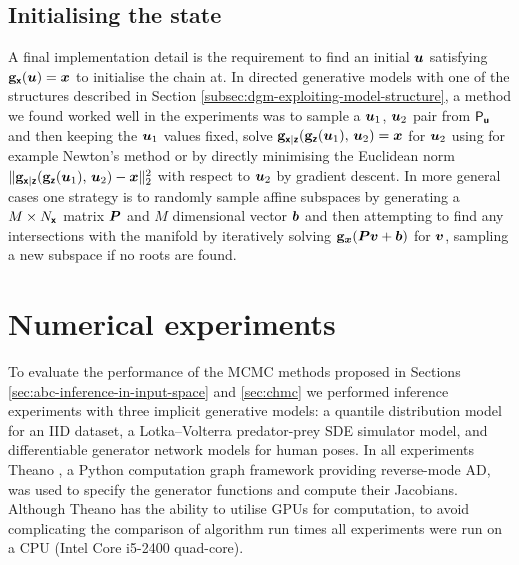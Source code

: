 \subsection{Initialising the state}

A final implementation detail is the requirement to find an initial $\boldsymbol{u}$ satisfying ${\mathbf{g}}_{\boldsymbol{\mathsf{x}}}(\boldsymbol{u}) = \boldsymbol{x}$ to initialise the chain at. In directed generative models with one of the structures described in Section \ref{subsec:dgm-exploiting-model-structure}, a method we found worked well in the experiments was to sample a $\boldsymbol{u}_1$, $\boldsymbol{u}_2$ pair from $\mathsf{P}_{\boldsymbol{\mathsf{u}}}$ and then keeping the $\boldsymbol{u}_1$ values fixed, solve $\genfunc_{\rvct{x}|\rvct{z}}\lpa\genfunc_{\rvct{z}}(\vct{u}_1),\,\vct{u}_2\rpa= \vct{x}$ for $\boldsymbol{u}_2$ using for example Newton's method or by directly minimising the Euclidean norm $\Vert\genfunc_{\rvct{x}|\rvct{z}}\lpa\genfunc_{\rvct{z}}(\vct{u}_1),\,\vct{u}_2\rpa - \vct{x}\Vert_2^2$ with respect to $\boldsymbol{u}_2$ by gradient descent. In more general cases one strategy is to randomly sample affine subspaces by generating a $M \times N_{\boldsymbol{\mathsf{x}}}$ matrix $\boldsymbol{P}$ and $M$ dimensional vector $\boldsymbol{b}$ and then attempting to find any intersections with the manifold by iteratively solving $\genfunc_{\vct{x}}\lpa\mtx{P}\vct{v} + \vct{b}\rpa$ for $\boldsymbol{v}$, sampling a new subspace if no roots are found.


\section{Numerical experiments}\label{sec:dgm-experiments}

To evaluate the performance of the \ac{MCMC} methods proposed in Sections \ref{sec:abc-inference-in-input-space} and \ref{sec:chmc} we performed inference experiments with three implicit generative models: a quantile distribution model for an \acs{IID} dataset, a Lotka--Volterra predator-prey \acs{SDE} simulator model, and differentiable generator network models for human poses. In all experiments Theano \citep{theano2016theano}, a Python computation graph framework providing reverse-mode \ac{AD}, was used to specify the generator functions and compute their Jacobians. Although Theano has the ability to utilise \acp{GPU} for computation, to avoid complicating the comparison of algorithm run times all experiments were run on a \ac{CPU} (Intel Core i5-2400 quad-core). %

